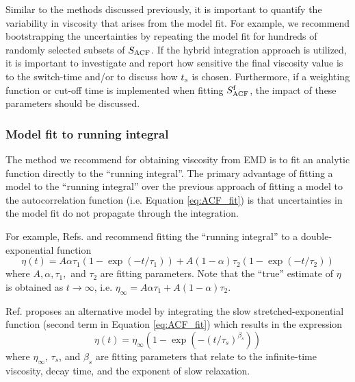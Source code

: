\documentclass[9pt,bestpractices]{livecoms}
\begin{document}
Similar to the methods discussed previously, it is important to quantify the variability in viscosity that arises from the model fit. For example, we recommend bootstrapping the uncertainties by repeating the model fit for hundreds of randomly selected subsets of $S_{\rm ACF}$. If the hybrid integration approach is utilized, it is important to investigate and report how sensitive the final viscosity value is to the switch-time and/or to discuss how $t_{\rm s}$ is chosen. Furthermore, if a weighting function or cut-off time is implemented when fitting $S^{\rm f}_{\rm ACF}$, the impact of these parameters should be discussed.

%
%

%

\subsubsection*{Model fit to running integral}

The method we recommend for obtaining viscosity from EMD is to fit an analytic function directly to the ``running integral''. The primary advantage of fitting a model to the ``running integral'' over the previous approach of fitting a model to the autocorrelation function (i.e. Equation \ref{eq:ACF_fit}) is that uncertainties in the model fit do not propagate through the integration. 

For example, Refs. \cite{ReyCastro2006} and \cite{Zhang2015} recommend fitting the ``running integral'' to a double-exponential function \begin{equation} \label{eq: Double exponential}
\eta(t) = A \alpha \tau_1 \left(1-\exp{(-t/\tau_1)}\right) + A (1-\alpha) \tau_2 \left(1-\exp{(-t/\tau_2)}\right)
\end{equation}
where $A, \alpha, \tau_1, $ and $\tau_2$ are fitting parameters. Note that the ``true'' estimate of $\eta$ is obtained as $t \to \infty$, i.e. $\eta_\infty = A \alpha \tau_1 + A (1-\alpha) \tau_2$. 

Ref. \cite{Borodin2009} proposes an alternative model by integrating the slow stretched-exponential function (second term in Equation \ref{eq:ACF_fit}) which results in the expression
\begin{equation} \label{eq:Borodin}
\eta(t) = \eta_\infty (1- \exp(-(t/\tau_s)^{\beta_s}))
\end{equation}
where $\eta_\infty$, $\tau_s$, and $\beta_s$ are fitting parameters that relate to the infinite-time viscosity, decay time, and the exponent of slow relaxation. 
\end{document}

